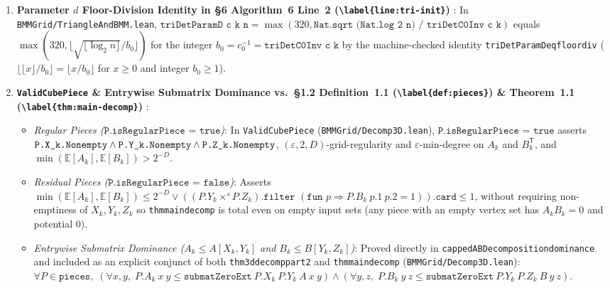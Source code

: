\documentclass[10pt,letterpaper]{article}
\renewcommand{\_}{\origunderscore\allowbreak}
\newcommand{\code}[1]{\texttt{#1}}
\begin{document}
\begin{enumerate}
\begin{itemize}
    \item \emph{Remaining Loops}: \code{minDegreeLoop} / \code{minDegreeLoopTracked} uses well-founded structural recursion on $|U'|$ (\code{termination\_by U'.card}), \code{processBlockTripleLoop} uses integer fuel $n \cdot n$ (\code{processBlockTripleLoop\_spec}), \code{rDecompAFuel} / \code{rDecomp2DFuel} / \code{rUncappedDecomp2DFuel} fuel the 2D outer loops, and \code{rSStarFuel} (\code{rSStarFuel\_ge\_of\_isBinaryMatrix}) fuels \code{sStarLoop}.
  \end{itemize}

  \item \textbf{Parameter $d$ Floor-Division Identity in \S 6 Algorithm~6 Line~2 (\code{\textbackslash label\{line:tri-init\}}) }:
  In \code{BMMGrid/TriangleAndBMM.lean}, $\code{triDetParamD c k n} = \max(320, \code{Nat.sqrt (Nat.log 2 n) / triDetC0Inv c k})$ equals $\max(320, \lfloor \sqrt{\lfloor \log_2 n \rfloor} / b_0 \rfloor)$ for the integer $b_0 = c_0^{-1} = \code{triDetC0Inv c k}$ by the machine-checked identity \code{triDetParamD\_eq\_floor\_div} ($\lfloor \lfloor x \rfloor / b_0 \rfloor = \lfloor x / b_0 \rfloor$ for $x \ge 0$ and integer $b_0 \ge 1$).

  \item \textbf{\code{ValidCubePiece} \& Entrywise Submatrix Dominance vs.\ \S 1.2 Definition~1.1 (\code{\textbackslash label\{def:pieces\}}) \& Theorem~1.1 (\code{\textbackslash label\{thm:main-decomp\}}) }:
  \begin{itemize}
    \item \emph{Regular Pieces ($\code{P.isRegularPiece = true}$)}: In \code{ValidCubePiece} (\code{BMMGrid/Decomp3D.lean}), $\code{P.isRegularPiece = true}$ asserts $\code{P.X\_k.Nonempty} \wedge \code{P.Y\_k.Nonempty} \wedge \code{P.Z\_k.Nonempty}$, $(\varepsilon, 2, D)$-grid-regularity and $\varepsilon$-min-degree on $A_k$ and $B_k^{\mathsf{T}}$, and $\min(\mathbb{E}[A_k], \mathbb{E}[B_k]) > 2^{-D}$.
    \item \emph{Residual Pieces ($\code{P.isRegularPiece = false}$)}: Asserts $\min(\mathbb{E}[A_k], \mathbb{E}[B_k]) \le 2^{-D} \vee ((P.Y_k \times^s P.Z_k).\code{filter }(\code{fun }p \Rightarrow P.B_k\ p.1\ p.2 = 1)).\code{card} \le 1$, without requiring non-emptiness of $X_k, Y_k, Z_k$ so \code{thm\_main\_decomp} is total even on empty input sets (any piece with an empty vertex set has $A_k B_k = 0$ and potential $0$).
    \item \emph{Entrywise Submatrix Dominance ($A_k \le A[X_k, Y_k]$ and $B_k \le B[Y_k, Z_k]$)}: Proved directly in \code{cappedABDecomposition\_dominance} and included as an explicit conjunct of both \code{thm\_3d\_decomp\_part2} and \code{thm\_main\_decomp} (\code{BMMGrid/Decomp3D.lean}): $\forall P \in \code{pieces},\; (\forall x, y,\; P.A_k\ x\ y \le \code{submatZeroExt}\ P.X_k\ P.Y_k\ A\ x\ y) \wedge (\forall y, z,\; P.B_k\ y\ z \le \code{submatZeroExt}\ P.Y_k\ P.Z_k\ B\ y\ z)$.
  \end{itemize}


\end{enumerate}
\end{document}
